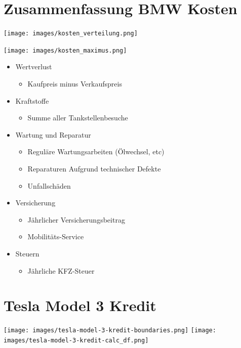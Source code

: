 \documentclass[landscape, DIV=99, 14pt]{scrartcl}
\begin{document}

\twocolumn
\section*{Zusammenfassung BMW Kosten}
\null
\vspace{1cm}
\begin{center}
\texttt{[image: images/kosten\_verteilung.png]}
\end{center}

\texttt{[image: images/kosten\_maximus.png]}

\pagebreak

\begin{itemize}
    \item Wertverlust
    \begin{itemize}
        \item Kaufpreis minus Verkaufspreis
    \end{itemize}
    \item Kraftstoffe
    \begin{itemize}
        \item Summe aller Tankstellenbesuche
    \end{itemize}
    \item Wartung und Reparatur
    \begin{itemize}
        \item Regul\"are Wartungsarbeiten (\"Olwechsel, etc)
        \item Reparaturen Aufgrund technischer Defekte
        \item Unfallsch\"aden
    \end{itemize}
    \item Versicherung
    \begin{itemize}
        \item J\"ahrlicher Versicherungsbeitrag
        \item Mobilit\"ats-Service
    \end{itemize}
    \item Steuern
    \begin{itemize}
            \item J\"ahrliche KFZ-Steuer
    \end{itemize}
\end{itemize}


\twocolumn

\section*{Tesla Model 3 Kredit}
\begin{center}
\texttt{[image: images/tesla-model-3-kredit-boundaries.png]}
\null
\vspace{0.5cm}
\texttt{[image: images/tesla-model-3-kredit-calc\_df.png]}
\end{center}
\end{document}
